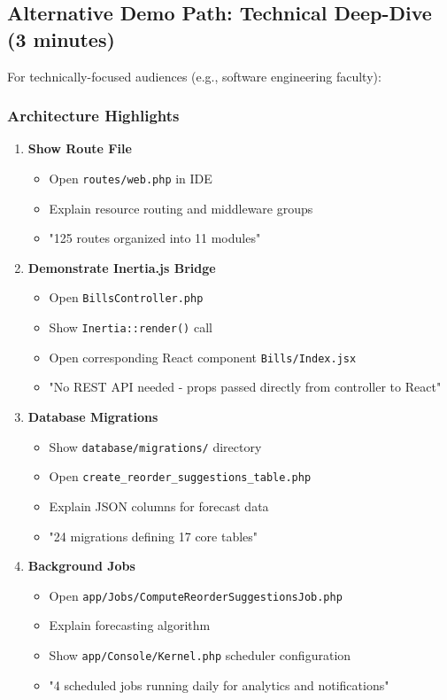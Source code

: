 \subsection{Alternative Demo Path: Technical Deep-Dive (3 minutes)}

For technically-focused audiences (e.g., software engineering faculty):

\subsubsection{Architecture Highlights}

\begin{enumerate}
    \item \textbf{Show Route File}
    \begin{itemize}
        \item Open \texttt{routes/web.php} in IDE
        \item Explain resource routing and middleware groups
        \item "125 routes organized into 11 modules"
    \end{itemize}
    
    \item \textbf{Demonstrate Inertia.js Bridge}
    \begin{itemize}
        \item Open \texttt{BillsController.php}
        \item Show \texttt{Inertia::render()} call
        \item Open corresponding React component \texttt{Bills/Index.jsx}
        \item "No REST API needed - props passed directly from controller to React"
    \end{itemize}
    
    \item \textbf{Database Migrations}
    \begin{itemize}
        \item Show \texttt{database/migrations/} directory
        \item Open \texttt{create\_reorder\_suggestions\_table.php}
        \item Explain JSON columns for forecast data
        \item "24 migrations defining 17 core tables"
    \end{itemize}
    
    \item \textbf{Background Jobs}
    \begin{itemize}
        \item Open \texttt{app/Jobs/ComputeReorderSuggestionsJob.php}
        \item Explain forecasting algorithm
        \item Show \texttt{app/Console/Kernel.php} scheduler configuration
        \item "4 scheduled jobs running daily for analytics and notifications"
    \end{itemize}
    

\end{enumerate}
